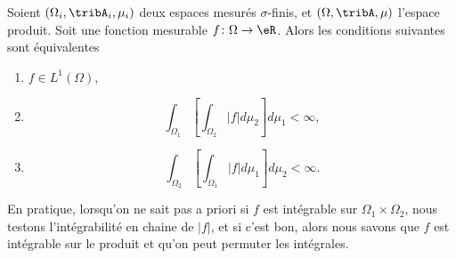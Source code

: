 \begin{corollary}\label{CorTKZKwP}
    Soient \( (\Omega_i,\tribA_i,\mu_i)\) deux espaces mesurés \( \sigma\)-finis, et \( (\Omega,\tribA,\mu)\) l'espace produit. Soit une fonction mesurable \( f\colon \Omega\to \eR\). Alors les conditions suivantes sont équivalentes
    \begin{enumerate}
        \item
            \( f\in L^1(\Omega)\),
        \item
            \begin{equation}
                \int_{\Omega_1}\left[ \int_{\Omega_2}| f |d\mu_2 \right]d\mu_1 <\infty,
            \end{equation}
        \item
            \begin{equation}
                \int_{\Omega_2}\left[ \int_{\Omega_1}| f |d\mu_1 \right]d\mu_2 <\infty.
            \end{equation}
    \end{enumerate}
\end{corollary}
En pratique, lorsqu'on ne sait pas a priori si \( f\) est intégrable sur \( \Omega_1\times \Omega_2\), nous testons l'intégrabilité en chaine de \( | f |\), et si c'est bon, alors nous savons que \( f\) est intégrable sur le produit et qu'on peut permuter les intégrales.

